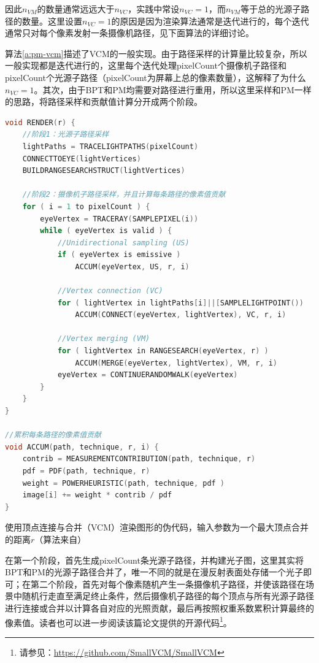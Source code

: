 因此$n_{VM}$的数量通常远远大于$n_{VC}$，实践中常设$n_{VC}=1$，而$n_{VM}$等于总的光源子路径的数量。这里设置$n_{VC}=1$的原因是因为渲染算法通常是迭代进行的，每个迭代通常只对每个像素发射一条摄像机路径，见下面算法的详细讨论。

算法\ref{a:pm-vcm}描述了VCM的一般实现。由于路径采样的计算量比较复杂，所以一般实现都是迭代进行的，这里每个迭代处理pixelCount个摄像机子路径和pixelCount个光源子路径（pixelCount为屏幕上总的像素数量），这解释了为什么$n_{VC}=1$。其次，由于BPT和PM均需要对路径进行重用，所以这里采样和PM一样的思路，将路径采样和贡献值计算分开成两个阶段。

\begin{algorithm}
\begin{lstlisting}[language=C++, mathescape]
void RENDER(r) {
	//阶段1：光源子路径采样
	lightPaths = TRACELIGHTPATHS(pixelCount) 
	CONNECTTOEYE(lightVertices) 
	BUILDRANGESEARCHSTRUCT(lightVertices)
	
	//阶段2：摄像机子路径采样，并且计算每条路径的像素值贡献
	for ( i = 1 to pixelCount ) {
		eyeVertex = TRACERAY(SAMPLEPIXEL(i)) 
		while ( eyeVertex is valid ) {
			//Unidirectional sampling (US) 
			if ( eyeVertex is emissive )
				ACCUM(eyeVertex, US, r, i) 
			
			//Vertex connection (VC)
			for ( lightVertex in lightPaths[i]||[SAMPLELIGHTPOINT()) 
				ACCUM(CONNECT(eyeVertex, lightVertex), VC, r, i) 
		
			//Vertex merging (VM)
			for ( lightVertex in RANGESEARCH(eyeVertex, r) )
				ACCUM(MERGE(eyeVertex, lightVertex), VM, r, i) 
			eyeVertex = CONTINUERANDOMWALK(eyeVertex) 
		}
	}
}
		
//累积每条路径的像素值贡献
void ACCUM(path, technique, r, i) {
	contrib = MEASUREMENTCONTRIBUTION(path, technique, r) 
	pdf = PDF(path, technique, r)
	weight = POWERHEURISTIC(path, technique, pdf )
	image[i] += weight * contrib / pdf
}
\end{lstlisting}
\caption{使用顶点连接与合并（VCM）渲染图形的伪代码，输入参数为一个最大顶点合并的距离$r$（算法来自\cite{a:LightTransportSimulationwithVertexConnectionandMerging}）}
\label{a:pm-vcm}
\end{algorithm}

在第一个阶段，首先生成pixelCount条光源子路径，并构建光子图，这里其实将BPT和PM的光源子路径合并了，唯一不同的就是在漫反射表面处存储一个光子即可；在第二个阶段，首先对每个像素随机产生一条摄像机子路径，并使该路径在场景中随机行走直至满足终止条件，然后摄像机子路径的每个顶点与所有光源子路径进行连接或合并以计算各自对应的光照贡献，最后再按照权重系数累积计算最终的像素值。读者也可以进一步阅读该篇论文提供的开源代码\footnote{请参见：\url{https://github.com/SmallVCM/SmallVCM}}。

